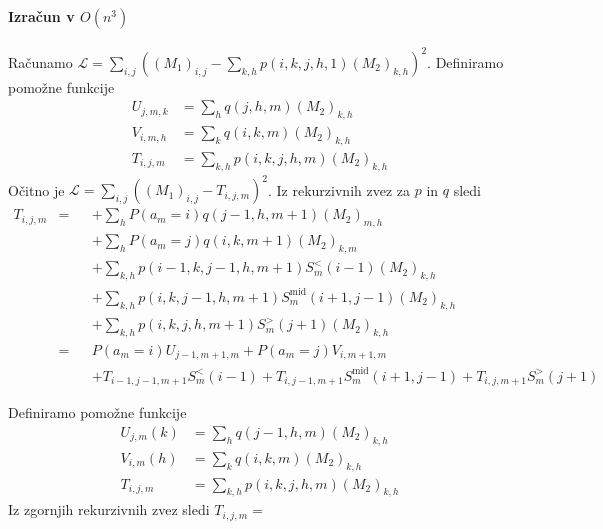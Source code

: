 \documentclass[mat2, tisk]{fmfdelo}
\newcommand{\loss }{\mathcal L}
\begin{document}
            \paragraph{Izračun v $O(n^3)$}
            Računamo
            $\loss = \sum_{i,j} \left ((M_1)_{i,j} - \sum_{k,h}p(i, k, j,
            h, 1) (M_2)_{k,h} \right )^2$. 
            Definiramo pomožne funkcije
            \begin{align*}
              U_{j, m, k} &= \sum_h q(j, h, m)(M_2)_{k, h} \\
              V_{i, m, h} &= \sum_k q(i, k, m)(M_2)_{k, h} \\
              T_{i, j, m} &= \sum_{k,h} p(i, k, j, h, m) (M_2)_{k,h}
            \end{align*}
            Očitno je $\loss = \sum_{i,j} \left ((M_1)_{i,j} - T_{i,
            j, m} \right )^2$. Iz rekurzivnih zvez za $p$ in $q$ 
            sledi 
            \begin{align*}
T_{i, j, m} &={} &
   &+\sum_h  P(a_m = i) q(j-1, h, m+1) (M_2)_{m,h}  \\
          &   & 
   &+\sum_h  P(a_m = j) q(i, k, m+1) (M_2)_{k,m} \\
          &   &
  &+ \sum_{k, h}  
      p(i-1, k, j-1, h, m+1) S_m^<(i-1) (M_2)_{k,h} \\
          &   &
   &+\sum_{k, h}   
      p(i, k, j-1, h, m+1) S_m^{\text{mid}}(i+1, j-1)(M_2)_{k,h} \\ 
          &   &
   &+\sum_{k, h}  
      p(i, k, j, h, m+1) S_m^>(j+1) (M_2)_{k,h} \\
   &={} &
   &P(a_m=i)  U_{j-1, m+1, m} +
   P(a_m=j) V_{i, m+1, m} \\
   & & &+  
   T_{i-1, j-1, m+1}  S_m^<(i-1) +
   T_{i, j-1, m+1}  S_m^{\text{mid}}(i+1, j-1) +
   T_{i, j, m+1}  S_m^>(j+1)
\end{align*}




            Definiramo pomožne funkcije
            \begin{align*}
              U_{j, m}(k) &= \sum_h q(j-1, h, m)(M_2)_{k, h} \\
              V_{i, m}(h) &= \sum_k q(i, k, m)(M_2)_{k, h} \\
              T_{i, j, m} &= \sum_{k,h} p(i, k, j, h, m) (M_2)_{k,h}
            \end{align*}
            Iz zgornjih rekurzivnih zvez sledi
            $T_{i, j, m} = $
\end{document}
